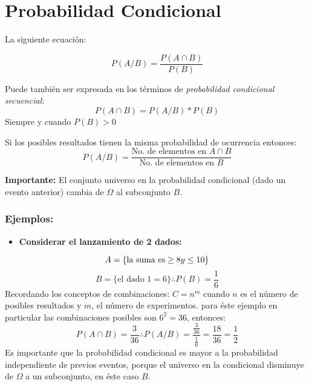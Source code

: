 \documentclass[]{book}
\providecommand{\tightlist}{%
  \setlength{\itemsep}{0pt}\setlength{\parskip}{0pt}}
\begin{document}
\section{Probabilidad Condicional}\label{probabilidad-condicional-1}

La siguiente ecuación:

\[P(A/B) = \frac{P(A\cap B)}{P(B)}\]

Puede también ser expresada en los términos de \emph{probabilidad
condicional secuencial}: \[P(A\cap B) = P(A/B)*P(B)\] Siempre y cuando
\(P(B)>0\)

Si los posibles resultados tienen la misma probabilidad de ocurrencia
entonces:
\[P(A/B) = \frac{\text{No. de elementos en } A\cap B}{\text{No. de elementos en }B}\]

\textbf{Importante:} El conjunto universo en la probabilidad condicional
(dado un evento anterior) cambia de \(\Omega\) al subconjunto \(B\).

\subsubsection{Ejemplos:}\label{ejemplos-1}

\begin{itemize}
\tightlist
\item
  \textbf{Considerar el lanzamiento de 2 dados:}
\end{itemize}

\[A = \{\text{la suma es}\geq 8 \space y \space \leq 10\}\]
\[B = \{\text{el dado 1}=6 \} \therefore P(B) = \frac {1}{6}\]
Recordando los conceptos de combinaciones: \(C = n^m\) cuando \(n\) es
el número de posibles resultados y \(m\), el número de experimentos.
para éste ejemplo en particular las combinaciones posibles son
\(6^2 = 36\), entonces:
\[P(A\cap B) = \frac {3}{36} \therefore P(A/B) = \frac {\frac {3}{36}}{\frac {1}{6}} = \frac {18}{36} = \frac {1}{2}\]
Es importante que la probabilidad condicional es mayor a la probabilidad
independiente de previos eventos, porque el universo en la condicional
disminuye de \(\Omega\) a un subconjunto, en éste caso \(B\).
\end{document}

